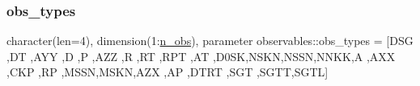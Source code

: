 \subsubsection{\texorpdfstring{obs\+\_\+types}{obs\_types}}
{\footnotesize\ttfamily character(len=4), dimension(1\+:\hyperlink{namespaceobservables_af01978bb96f8f41956fee58691edf7fc}{n\+\_\+obs}), parameter observables\+::obs\+\_\+types = \mbox{[}\textquotesingle{}D\+SG \textquotesingle{},\textquotesingle{}DT \textquotesingle{},\textquotesingle{}A\+YY \textquotesingle{},\textquotesingle{}D \textquotesingle{},\textquotesingle{}P \textquotesingle{},\textquotesingle{}A\+ZZ \textquotesingle{},\textquotesingle{}R \textquotesingle{} ,\textquotesingle{}RT \textquotesingle{},\textquotesingle{}R\+PT \textquotesingle{},\textquotesingle{}AT \textquotesingle{},\textquotesingle{}D0\+SK\textquotesingle{},\textquotesingle{}N\+S\+KN\textquotesingle{},\textquotesingle{}N\+S\+SN\textquotesingle{},\textquotesingle{}N\+N\+KK\textquotesingle{},\textquotesingle{}A \textquotesingle{} ,\textquotesingle{}A\+XX \textquotesingle{},\textquotesingle{}C\+KP \textquotesingle{},\textquotesingle{}RP \textquotesingle{},\textquotesingle{}M\+S\+SN\textquotesingle{},\textquotesingle{}M\+S\+KN\textquotesingle{},\textquotesingle{}A\+ZX \textquotesingle{},\textquotesingle{}AP \textquotesingle{},\textquotesingle{}D\+T\+RT\textquotesingle{} ,\textquotesingle{}S\+GT \textquotesingle{},\textquotesingle{}S\+G\+TT\textquotesingle{},\textquotesingle{}S\+G\+TL\textquotesingle{}\mbox{]}\hspace{0.3cm}{\ttfamily [private]}}

